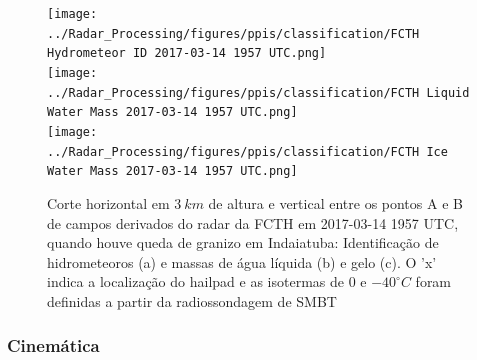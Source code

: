 \begin{figure}[htb]
	\centering
	\caption{Corte horizontal em $3\:km$ de altura e vertical entre os pontos A e B de campos derivados do radar da FCTH em 2017-03-14 1957 UTC, quando houve queda de granizo em Indaiatuba: Identificação de hidrometeoros (a) e massas de água líquida (b) e gelo (c). O 'x' indica a localização do hailpad e as isotermas de $0$ e $-40^{\circ}C$ foram definidas a partir da radiossondagem de SMBT} 
	\label{radar_derived_20170314_2}
	\vspace{-5pt}
	\texttt{[image: ../Radar\_Processing/figures/ppis/classification/FCTH Hydrometeor ID 2017-03-14 1957 UTC.png]}
	\label{hid_20170314_2} \\
	\vspace{-15pt}
	\texttt{[image: ../Radar\_Processing/figures/ppis/classification/FCTH Liquid Water Mass 2017-03-14 1957 UTC.png]}
	\label{ml_20170314_2} \\
	\vspace{-15pt}
	\texttt{[image: ../Radar\_Processing/figures/ppis/classification/FCTH Ice Water Mass 2017-03-14 1957 UTC.png]}
	\label{mi_20170314_2} \\
	\vspace{-5pt}
\end{figure}

\subsubsection{Cinemática}\label{cinematica_201703014}

